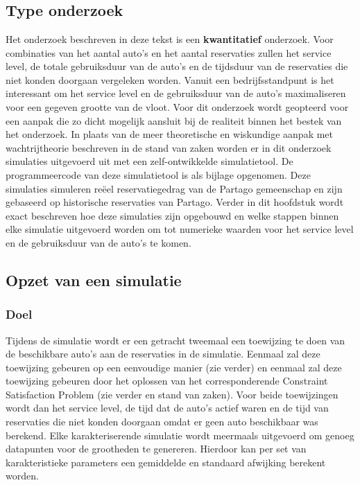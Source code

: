 
\chapter{}
\label{ch:methodologie}

\section{Type onderzoek}
Het onderzoek beschreven in deze tekst is een \textbf{kwantitatief} onderzoek. Voor combinaties van het aantal auto's en het aantal reservaties zullen het service level, de totale gebruiksduur van de auto's en de tijdsduur van de reservaties die niet konden doorgaan vergeleken worden. Vanuit een bedrijfsstandpunt is het interessant om het service level en de gebruiksduur van de auto's maximaliseren voor een gegeven grootte van de vloot. Voor dit onderzoek wordt geopteerd voor een aanpak die zo dicht mogelijk aansluit bij de realiteit binnen het bestek van het onderzoek. In plaats van de meer theoretische en wiskundige aanpak met wachtrijtheorie beschreven in de stand van zaken worden er in dit onderzoek simulaties uitgevoerd uit met een zelf-ontwikkelde simulatietool. De programmeercode van deze simulatietool is als bijlage opgenomen. Deze simulaties simuleren reëel reservatiegedrag van de Partago gemeenschap en zijn gebaseerd op historische reservaties van Partago. Verder in dit hoofdstuk wordt exact beschreven hoe deze simulaties zijn opgebouwd en welke stappen binnen elke simulatie uitgevoerd worden om tot numerieke waarden voor het service level en de gebruiksduur van de auto's te komen. 

\section{Opzet van een simulatie}
\subsection{Doel}
Tijdens de simulatie wordt er een getracht tweemaal een toewijzing te doen van de beschikbare auto's aan de reservaties in de simulatie. Eenmaal zal deze toewijzing gebeuren op een eenvoudige manier (zie verder) en eenmaal zal deze toewijzing gebeuren door het oplossen van het corresponderende Constraint Satisfaction Problem (zie verder en stand van zaken). Voor beide toewijzingen wordt dan het service level, de tijd dat de auto's actief waren en de tijd van reservaties die niet konden doorgaan omdat er geen auto beschikbaar was berekend. Elke karakteriserende simulatie wordt meermaals uitgevoerd om genoeg datapunten voor de grootheden te genereren. Hierdoor kan per set van karakteristieke parameters een gemiddelde en standaard afwijking berekent worden. 

